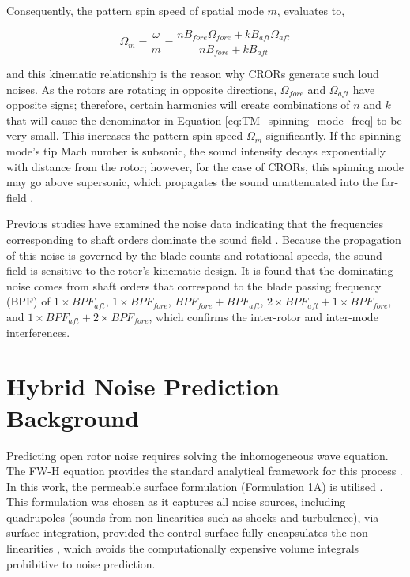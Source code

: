 Consequently, the pattern spin speed of spatial mode $m$, evaluates to,

\begin{equation}
    \Omega_m = \frac{\omega}{m} = \frac{nB_{fore}\Omega_{fore} + kB_{aft}\Omega_{aft}}{nB_{fore}+kB_{aft}}
    \label{eq:TM_spinning_mode_freq}
\end{equation}

and this kinematic relationship is the reason why CRORs generate such loud noises. As the rotors are rotating in opposite directions, $\Omega_{fore}$ and $\Omega_{aft}$ have opposite signs; therefore, certain harmonics will create combinations of $n$ and $k$ that will cause the denominator in Equation \ref{eq:TM_spinning_mode_freq} to be very small. This increases the pattern spin speed $\Omega_m$ significantly. If the spinning mode's tip Mach number is subsonic, the sound intensity decays exponentially with distance from the rotor; however, for the case of CRORs, this spinning mode may go above supersonic, which propagates the sound unattenuated into the far-field \cite{TylerSofrin1962}.

Previous studies have examined the noise data indicating that the frequencies corresponding to shaft orders dominate the sound field \cite{Dunn2014, Envia2014, vanZante2014}. Because the propagation of this noise is governed by the blade counts and rotational speeds, the sound field is sensitive to the rotor's kinematic design. It is found that the dominating noise comes from shaft orders that correspond to the blade passing frequency (BPF) of $1\times BPF_{aft}$, $1\times BPF_{fore}$, $BPF_{fore} + BPF_{aft}$, $2\times BPF_{aft} + 1\times BPF_{fore}$, and $1\times BPF_{aft} + 2\times BPF_{fore}$, which confirms the inter-rotor and inter-mode interferences. %

\section{Hybrid Noise Prediction Background}\label{sec:hybrid_background}
Predicting open rotor noise requires solving the inhomogeneous wave equation. The FW-H equation provides the standard analytical framework for this process \cite{Dowling1983}. In this work, the permeable surface formulation (Formulation 1A) is utilised \cite{FfowcsWilliams1969, Brentner1997, Najafi-Yazdi2011}. This formulation was chosen as it captures all noise sources, including quadrupoles (sounds from non-linearities such as shocks and turbulence), via surface integration, provided the control surface fully encapsulates the non-linearities \cite{Morgans2004}, which avoids the computationally expensive volume integrals prohibitive to noise prediction. 


